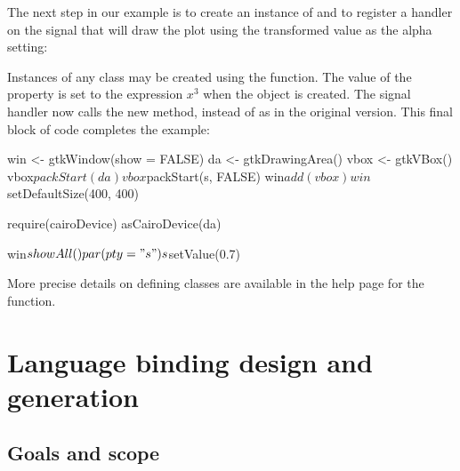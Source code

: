 \documentclass[article,shortnames]{jss}
\begin{document}
The next step in our example is to create an instance
of  and to register a handler on the 
 signal that will draw the plot using the
transformed
value as 
the alpha setting:
Instances of any  class may be created using the
 function.  The value of the  property is set
to the  expression $x^3$ when the object is created.  The
signal handler
now calls the new  method, instead of
 as in the original version. This final block of code
completes the example:
\begin{Code}
win <- gtkWindow(show = FALSE)
da <- gtkDrawingArea()
vbox <- gtkVBox()
vbox$packStart(da)
vbox$packStart(s, FALSE)
win$add(vbox)
win$setDefaultSize(400, 400)

require(cairoDevice)
asCairoDevice(da)

win$showAll()
par(pty = "s")
s$setValue(0.7)
\end{Code}

More precise details on defining  classes are available
in the 
 help page for the  function.


\section{Language binding design and generation}

\subsection{Goals and scope}
\end{document}
